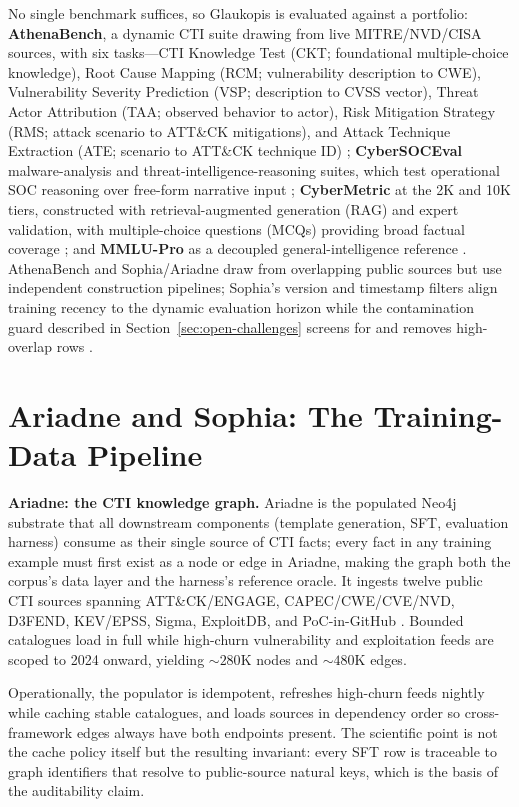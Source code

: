 \documentclass[conference]{IEEEtran}
\begin{document}
No single benchmark suffices, so Glaukopis is evaluated against a portfolio: \textbf{AthenaBench}, a dynamic CTI suite drawing from live MITRE/NVD/CISA sources, with six tasks---CTI Knowledge Test (CKT; foundational multiple-choice knowledge), Root Cause Mapping (RCM; vulnerability description to CWE), Vulnerability Severity Prediction (VSP; description to CVSS vector), Threat Actor Attribution (TAA; observed behavior to actor), Risk Mitigation Strategy (RMS; attack scenario to ATT\&CK mitigations), and Attack Technique Extraction (ATE; scenario to ATT\&CK technique ID) \cite{alam2025athenabench}; \textbf{CyberSOCEval} malware-analysis and threat-intelligence-reasoning suites, which test operational SOC reasoning over free-form narrative input \cite{cybersoceval2025}; \textbf{CyberMetric} at the 2K and 10K tiers, constructed with retrieval-augmented generation (RAG) and expert validation, with multiple-choice questions (MCQs) providing broad factual coverage \cite{tihanyi2024cybermetric}; and \textbf{MMLU-Pro} as a decoupled general-intelligence reference \cite{wang2024mmlupro}. AthenaBench and Sophia/Ariadne draw from overlapping public sources but use independent construction pipelines; Sophia's version and timestamp filters align training recency to the dynamic evaluation horizon while the contamination guard described in Section~\ref{sec:open-challenges} screens for and removes high-overlap rows \cite{alam2025athenabench}.

\section{Ariadne and Sophia: The Training-Data Pipeline}
\label{sec:cti-kg}

\textbf{Ariadne: the CTI knowledge graph.} Ariadne is the populated Neo4j substrate that all downstream components (template generation, SFT, evaluation harness) consume as their single source of CTI facts; every fact in any training example must first exist as a node or edge in Ariadne, making the graph both the corpus's data layer and the harness's reference oracle. It ingests twelve public CTI sources spanning ATT\&CK/ENGAGE, CAPEC/CWE/CVE/NVD, D3FEND, KEV/EPSS, Sigma, ExploitDB, and PoC-in-GitHub \cite{strom2018mitreattck,mitreCAPEC,mitreCWE,mitreCVE}. Bounded catalogues load in full while high-churn vulnerability and exploitation feeds are scoped to 2024 onward, yielding ${\sim}280$K nodes and ${\sim}480$K edges.

Operationally, the populator is idempotent, refreshes high-churn feeds nightly while caching stable catalogues, and loads sources in dependency order so cross-framework edges always have both endpoints present. The scientific point is not the cache policy itself but the resulting invariant: every SFT row is traceable to graph identifiers that resolve to public-source natural keys, which is the basis of the auditability claim.
\end{document}
